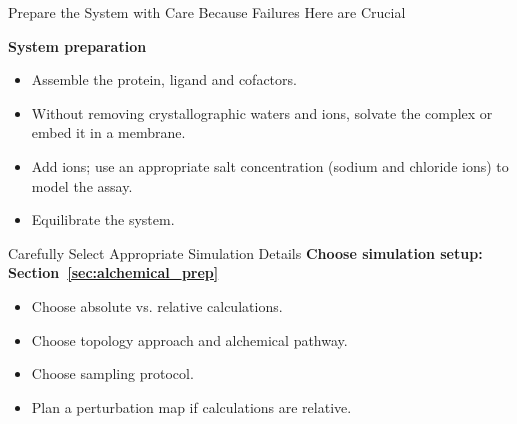 \documentclass[9pt,bestpractices]{livecoms}
\begin{document}
\begin{Checklists*}[hp!]
\begin{checklist}{Prepare the System with Care Because Failures Here are Crucial}
\begin{itemize}
\begin{itemize}
    \end{itemize}
    \end{itemize}
        \textbf{System preparation}
    \begin{itemize}
        \item Assemble the protein, ligand and cofactors. 
        \item Without removing crystallographic waters and ions, solvate the complex or embed it in a membrane. 
        \item Add ions; use an appropriate salt concentration (sodium and chloride ions) to model the assay.
        \item Equilibrate the system.
    \end{itemize}
\end{checklist}

\begin{checklist}{Carefully Select Appropriate Simulation Details}
\textbf{Choose simulation setup: Section~\ref{sec:alchemical_prep}}
    \begin{itemize}
        \item Choose absolute vs. relative calculations.
        \item Choose topology approach and alchemical pathway.
        \item Choose sampling protocol.
        \item Plan a perturbation map if calculations are relative.
    \end{itemize}
\end{checklist}
\end{Checklists*}
%
%
\end{document}
